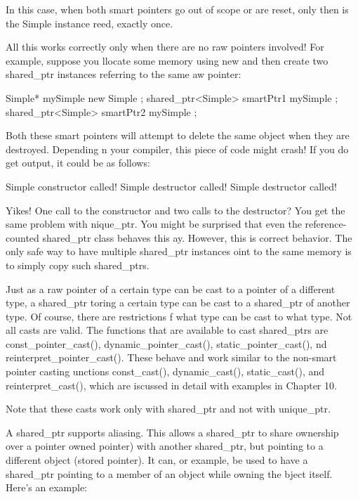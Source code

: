 In this case, when both smart pointers go out of scope or are reset, only then is the Simple instance reed, exactly once.

All this works correctly only when there are no raw pointers involved! For example, suppose you llocate some memory using new and then create two shared\_ptr instances referring to the same aw pointer:

\begin{cpp}
Simple* mySimple { new Simple{} };
shared_ptr<Simple> smartPtr1 { mySimple };
shared_ptr<Simple> smartPtr2 { mySimple };
\end{cpp}

Both these smart pointers will attempt to delete the same object when they are destroyed. Depending n your compiler, this piece of code might crash! If you do get output, it could be as follows:

\begin{shell}
Simple constructor called!
Simple destructor called!
Simple destructor called!
\end{shell}

Yikes! One call to the constructor and two calls to the destructor? You get the same problem with nique\_ptr. You might be surprised that even the reference-counted shared\_ptr class behaves this ay. However, this is correct behavior. The only safe way to have multiple shared\_ptr instances oint to the same memory is to simply copy such shared\_ptrs.


Just as a raw pointer of a certain type can be cast to a pointer of a different type, a shared\_ptr toring a certain type can be cast to a shared\_ptr of another type. Of course, there are restrictions f what type can be cast to what type. Not all casts are valid. The functions that are available to cast shared\_ptrs are const\_pointer\_cast(), dynamic\_pointer\_cast(), static\_pointer\_cast(), nd reinterpret\_pointer\_cast(). These behave and work similar to the non-smart pointer casting unctions const\_cast(), dynamic\_cast(), static\_cast(), and reinterpret\_cast(), which are iscussed in detail with examples in Chapter 10.

Note that these casts work only with shared\_ptr and not with unique\_ptr.


A shared\_ptr supports aliasing. This allows a shared\_ptr to share ownership over a pointer owned pointer) with another shared\_ptr, but pointing to a different object (stored pointer). It can, or example, be used to have a shared\_ptr pointing to a member of an object while owning the bject itself. Here’s an example:

